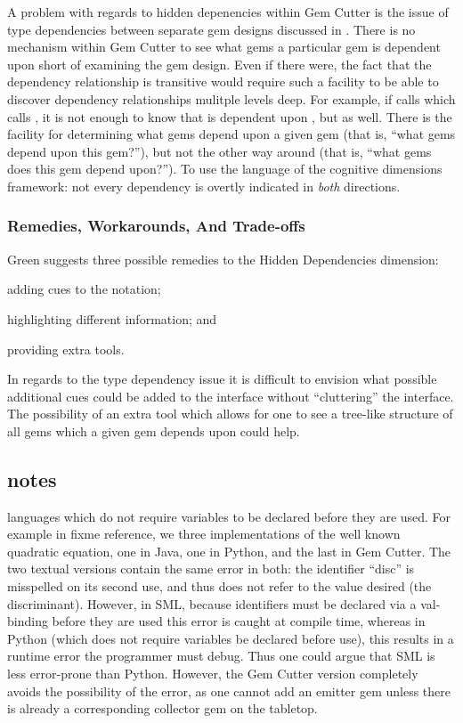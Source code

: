 A problem with regards to hidden depenencies within Gem Cutter is the issue of type dependencies between separate gem designs discussed in .  There is no mechanism within Gem Cutter to see what gems a particular gem is dependent upon short of examining the gem design.  Even if there were, the fact that the dependency relationship is transitive would require such a facility to be able to discover dependency relationships mulitple levels deep.  For example, if  calls  which calls , it is not enough to know that  is dependent upon , but  as well.  There is the facility for determining what gems depend upon a given gem (that is, ``what gems depend upon this gem?''), but not the other way around (that is, ``what gems does this gem depend upon?'').  To use the language of the cognitive dimensions framework: not every dependency is overtly indicated in \emph{both} directions.

\subsubsection{Remedies, Workarounds, And Trade-offs}

Green suggests three possible remedies to the Hidden Dependencies dimension: 
\begin{inparaenum}[(a)]
	\item adding cues to the notation;
	\item highlighting different information; and 
	\item providing extra tools.
\end{inparaenum}

In regards to the type dependency issue it is difficult to envision what possible additional cues could be added to the interface without ``cluttering'' the interface.  The possibility of an extra tool which allows for one to see a tree-like structure of all gems which a given gem depends upon could help.

\subsection{notes}

languages which do not require variables to be declared before they are used.  For example in fixme reference, we three implementations of the well known quadratic equation, one in Java, one in Python, and the last in Gem Cutter.  The two textual versions contain the same error in both: the identifier ``disc'' is misspelled on its second use, and thus does not refer to the value desired (the discriminant).  However, in SML, because identifiers must be declared via a val-binding before they are used this error is caught at compile time, whereas in Python (which does not require variables be declared before use), this results in a runtime error the programmer must debug.  Thus one could argue that SML is less error-prone than Python.  However, the Gem Cutter version completely avoids the possibility of the error, as one cannot add an emitter gem unless there is already a corresponding collector gem on the tabletop.


